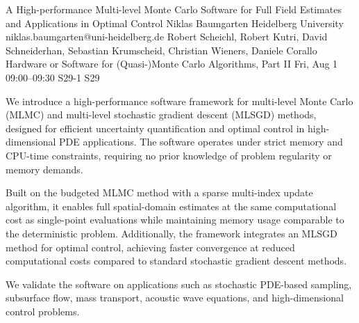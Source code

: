 \begin{talk}
  {A High-performance Multi-level Monte Carlo Software for Full Field Estimates and Applications in Optimal Control}%
  {Niklas Baumgarten}%
  {Heidelberg University}%
  {niklas.baumgarten@uni-heidelberg.de}%
  {Robert Scheichl, Robert Kutri, David Schneiderhan, Sebastian Krumscheid, Christian Wieners, Daniele Corallo}%
  {Hardware or Software for (Quasi-)Monte Carlo Algorithms, Part II}%
  {Fri, Aug 1 09:00–09:30}%
  {S29-1}%
  {S29}%


We introduce a high-performance software framework for multi-level Monte Carlo (MLMC)
and multi-level stochastic gradient descent (MLSGD) methods,
designed for efficient uncertainty quantification and optimal control in high-dimensional PDE applications.
The software operates under strict memory and CPU-time constraints,
requiring no prior knowledge of problem regularity or memory demands.

Built on the budgeted MLMC method with a sparse multi-index update algorithm,
it enables full spatial-domain estimates at the same computational cost as single-point
evaluations while maintaining memory usage comparable to the deterministic problem.
Additionally, the framework integrates an MLSGD method for optimal control,
achieving faster convergence at reduced computational costs compared to standard
stochastic gradient descent methods.

We validate the software on applications such as stochastic PDE-based sampling, subsurface flow,
mass transport, acoustic wave equations, and high-dimensional control problems.


\end{talk}

